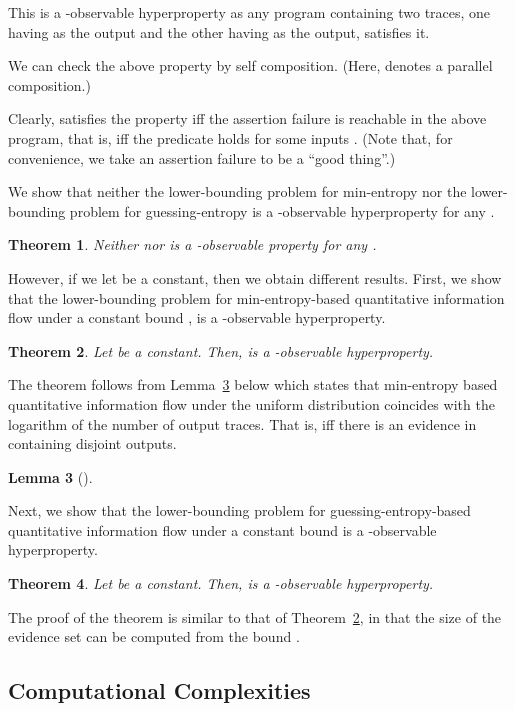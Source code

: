 \documentclass[]{eptcs}
\newtheorem{theorem}{Theorem}[section]
\newtheorem{lemma}[theorem]{Lemma}
\begin{document}
This is a -observable hyperproperty as any program containing two
traces, one having  as the output and the other having  as the
output, satisfies it.

We can check the above property by self composition.  (Here, 
denotes a parallel composition.)

Clearly,  satisfies the property iff the assertion failure is
reachable in the above program, that is, iff the predicate  holds for some inputs .  (Note that, for convenience, we
take an assertion failure to be a ``good thing''.)

We show that neither the lower-bounding problem for min-entropy nor
the lower-bounding problem for guessing-entropy is a -observable
hyperproperty for any .
\begin{theorem}
\label{thm:LMELGEnkl}
  Neither  nor  is a
  -observable property for any .
\end{theorem}

However, if we let  be a constant, then we obtain different
results.  First, we show that the lower-bounding problem for
min-entropy-based quantitative information flow under a constant bound
, is a -observable hyperproperty.
\begin{theorem}
\label{thm:lmel}
Let  be a constant.  Then,  is a -observable hyperproperty.
\end{theorem}
The theorem follows from Lemma~\ref{lem:melog} below which states that
min-entropy based quantitative information flow under the uniform
distribution coincides with the logarithm of the number of output
traces.  That is,  iff there is an
evidence in  containing  disjoint outputs.
\begin{lemma}[\cite{smith09}]
\label{lem:melog}

\end{lemma}

Next, we show that the lower-bounding problem for
guessing-entropy-based quantitative information flow under a constant
bound  is a -observable hyperproperty.
\begin{theorem}
\label{thm:lgel}
  Let  be a constant.  Then,  is a -observable hyperproperty.
\end{theorem}
The proof of the theorem is similar to that of Theorem~\ref{thm:lmel},
in that the size of the evidence set can be computed from the bound
.


\subsection{Computational Complexities}
\label{sec:complower}
\end{document}
